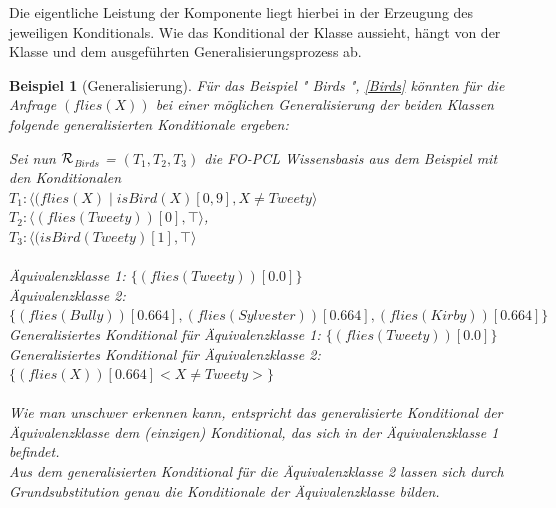 \documentclass[a4paper, 11pt]{book}
\newtheorem{Bsp}{Beispiel}[section]
\begin{document}
Die eigentliche Leistung der Komponente liegt hierbei in der Erzeugung des jeweiligen Konditionals. Wie das Konditional der Klasse aussieht, hängt von der Klasse und dem ausgeführten Generalisierungsprozess ab. 
\begin{Bsp}[Generalisierung]\label{Bsp:Generalisierung}
Für das Beispiel "{} Birds "{}, \ref{Birds} könnten für die Anfrage $ (flies(X)) $ bei einer möglichen Generalisierung der beiden Klassen folgende generalisierten Konditionale ergeben: 


\noindent
Sei nun $ \cal{R} $$_{Birds}  $ = $ (T_1, T_2, T_3)  $ die FO-PCL Wissensbasis aus dem Beispiel mit den Konditionalen
\\
$ T_{1} : \langle (flies(X) \mid isBird(X)[0,9], X \neq Tweety \rangle$\\	
$ T_{2}  :  \langle (flies(Tweety))[0], \top \rangle $,\\
$ T_{3} : \langle (isBird(Tweety) [1], \top \rangle$\\
\\
Äquivalenzklasse 1: $\{(flies(Tweety))[0.0]\}$\\
Äquivalenzklasse 2: $\{(flies(Bully))[0.664], (flies(Sylvester))[0.664], (flies(Kirby))[0.664]\}$\\
\noindent
Generalisiertes Konditional für Äquivalenzklasse 1: $\{(flies(Tweety))[0.0]\}$\\
Generalisiertes Konditional für Äquivalenzklasse 2: $\{(flies(X))[0.664]<X \neq Tweety>\}$\\
\\
Wie man unschwer erkennen kann, entspricht das generalisierte Konditional der Äquivalenzklasse dem (einzigen) Konditional, das sich in der Äquivalenzklasse 1 befindet.\\
Aus dem generalisierten Konditional für die Äquivalenzklasse 2 lassen sich durch Grundsubstitution genau die Konditionale der Äquivalenzklasse bilden.
\end{Bsp}
\end{document}
